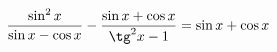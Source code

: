 \begin{ex}[type=expression]
	\begin{condition}
		\( \dfrac{\sin^2x}{\sin x-\cos x}-\dfrac{\sin x+\cos x}{\tg^2x-1}=\sin x+\cos x \)
	\end{condition}
\end{ex}